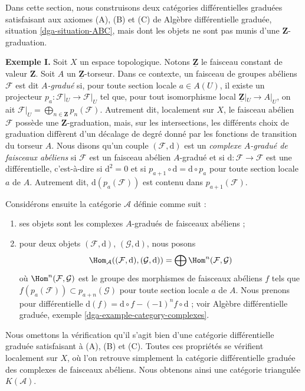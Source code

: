 \noindent
Dans cette section, nous construisons deux catégories différentielles graduées
satisfaisant aux axiomes (A), (B) et (C) de
Algèbre différentielle graduée, situation \ref{dga-situation-ABC},
mais dont les objets ne sont pas munis d'une $\mathbf{Z}$-graduation.

\medskip\noindent
{\bf Exemple I.} Soit $X$ un espace topologique. Notons
$\underline{\mathbf{Z}}$ le faisceau constant de valeur $\mathbf{Z}$.
Soit $A$ un $\underline{\mathbf{Z}}$-torseur. Dans ce contexte, un faisceau
de groupes abéliens $\mathcal{F}$ est dit {\it $A$-gradué} si, pour toute
section locale $a \in A(U)$, il existe un projecteur
$p_a : \mathcal{F}|_U \to \mathcal{F}|_U$ tel que, pour tout isomorphisme
local $\underline{\mathbf{Z}}|_U \to A|_U$, on ait
$\mathcal{F}|_U = \bigoplus_{n \in \mathbf{Z}} p_n(\mathcal{F})$.
Autrement dit, localement sur $X$, le faisceau abélien $\mathcal{F}$ possède
une $\mathbf{Z}$-graduation, mais, sur les intersections, les différents choix
de graduation diffèrent d'un décalage de degré donné par les fonctions de
transition du torseur $A$.
Nous disons qu'un couple $(\mathcal{F}, \text{d})$ est un
{\it complexe $A$-gradué de faisceaux abéliens} si $\mathcal{F}$
est un faisceau abélien $A$-gradué et si $\text{d} : \mathcal{F} \to \mathcal{F}$ est une différentielle,
c'est-à-dire si $\text{d}^2 = 0$ et si
$p_{a + 1} \circ \text{d} = \text{d} \circ p_a$ pour toute section locale
$a$ de $A$. Autrement dit, $\text{d}(p_a(\mathcal{F}))$
est contenu dans $p_{a + 1}(\mathcal{F})$.

\medskip\noindent
Considérons ensuite la catégorie $\mathcal{A}$ définie comme suit :
\begin{enumerate}
\item ses objets sont les complexes $A$-gradués de faisceaux abéliens ;
\item pour deux objets $(\mathcal{F}, \text{d})$, $(\mathcal{G}, \text{d})$, nous posons
$$
\Hom_\mathcal{A}((\mathcal{F}, \text{d}), (\mathcal{G}, \text{d})) =
\bigoplus \Hom^n(\mathcal{F}, \mathcal{G})
$$
où $\Hom^n(\mathcal{F}, \mathcal{G})$ est le groupe des
morphismes de faisceaux abéliens $f$ tels que
$f(p_a(\mathcal{F})) \subset p_{a + n}(\mathcal{G})$ pour toute
section locale $a$ de $A$. Nous prenons pour différentielle
$\text{d}(f) = \text{d} \circ f - (-1)^n f \circ \text{d}$ ; voir
Algèbre différentielle graduée, exemple \ref{dga-example-category-complexes}.
\end{enumerate}
Nous omettons la vérification qu'il s'agit bien d'une catégorie différentielle
graduée satisfaisant à (A), (B) et (C). Toutes ces propriétés se vérifient
localement sur $X$, où l'on retrouve simplement la catégorie différentielle
graduée des complexes de faisceaux abéliens. Nous obtenons ainsi une catégorie
triangulée $K(\mathcal{A})$.

